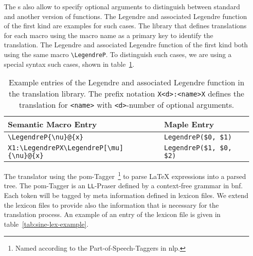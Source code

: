 The \Macro s also allow to specify optional arguments to distinguish between standard and another version of functions. The Legendre and associated Legendre function of the first kind are examples for such cases. The library that defines translations for each macro using the macro name as a primary key to identify the translation. The Legendre and associated Legendre function of the first kind both using the same macro \verb|\LegendreP|. To distinguish such cases, we are using a special syntax such cases, shown in table~\ref{tab:legendreP-lex}.

\begin{table}[ht!]
	\centering
	\begin{tabular}{ll}
		\hline
		Semantic Macro Entry & Maple Entry \\
		\hline
		\verb|\LegendreP{\nu}@{x}| & \verb|LegendreP($0, $1)| \\
		\verb|X1:\LegendrePX\LegendreP[\mu]{\nu}@{x}| & \verb|LegendreP($1, $0, $2)|\\
		\hline
	\end{tabular}
	\caption{Example entries of the Legendre and associated Legendre function in the translation library. The prefix notation \texttt{X<d>:<name>X} defines the translation for \texttt{<name>} with \texttt{<d>}-number of optional arguments.}
	\label{tab:legendreP-lex}
\end{table}

The translator using the \gls*{pom}-Tagger~\parencite{POM-Tagger}\footnote{Named according to the Part-of-Speech-Taggers in \gls*{nlp}.} to parse \LaTeX{} expressions into a parsed tree. The \gls*{pom}-Tagger is an \texttt{LL}-Praser defined by a context-free grammar in \gls*{bnf}. Each token will be tagged by meta information defined in lexicon files. We extend the lexicon files to provide also the information that is necessary for the translation process. An example of an entry of the lexicon file is given in table~\ref{tab:sine-lex-example}.

